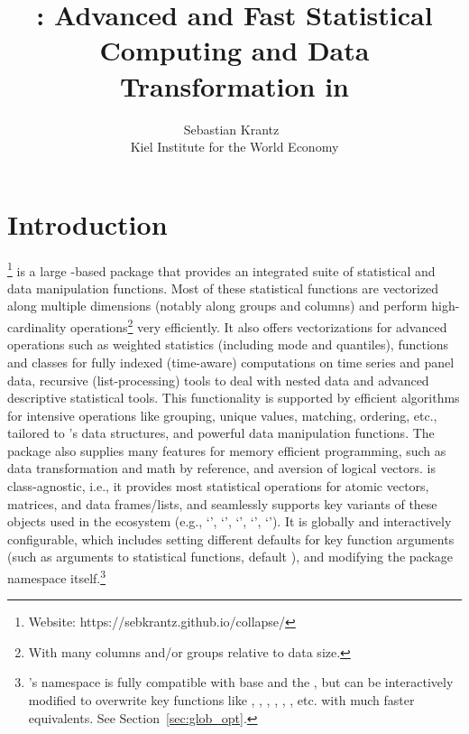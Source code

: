 \documentclass[nojss]{jss} %
\author{Sebastian Krantz~\orcidlink{0000-0001-6212-5229}\\Kiel Institute for the World Economy}
\title{\proglang{collapse}: Advanced and Fast Statistical Computing and Data Transformation in \proglang{R}}
\newcommand{\class}[1]{`\code{#1}'}
\begin{document}


\section[Introduction]{Introduction} \label{sec:intro}
%
\href{https://sebkrantz.github.io/collapse/}{}\footnote{Website: https://sebkrantz.github.io/collapse/} is a large -based  package that provides an integrated suite of statistical and data manipulation functions. Most of these statistical functions are vectorized along multiple dimensions (notably along groups and columns) and perform high-cardinality operations\footnote{With many columns and/or groups relative to data size.} very efficiently. It also offers vectorizations for advanced operations such as weighted statistics (including mode and quantiles), functions and classes for fully indexed (time-aware) computations on time series and panel data, recursive (list-processing) tools to deal with nested data and advanced descriptive statistical tools. This functionality is supported by efficient algorithms for intensive operations like grouping, unique values, matching, ordering, etc., tailored to 's data structures, and powerful data manipulation functions. The package also supplies many features for memory efficient  programming, such as data transformation and math by reference, and aversion of logical vectors.  is class-agnostic, i.e., it provides most statistical operations for atomic vectors, matrices, and data frames/lists, and seamlessly supports key variants of these objects used in the  ecosystem (e.g., \class{tibble}, \class{data.table}, \class{sf}, \class{xts}, \class{pdata.frame}). It is globally and interactively configurable, which includes setting different defaults for key function arguments (such as  arguments to statistical functions, default ), and modifying the package namespace itself.\footnote{'s namespace is fully compatible with base  and the , but can be interactively modified to overwrite key functions like , , , , , ,  etc. with much faster  equivalents. See Section~\ref{sec:glob_opt}.} \newline
\end{document}
